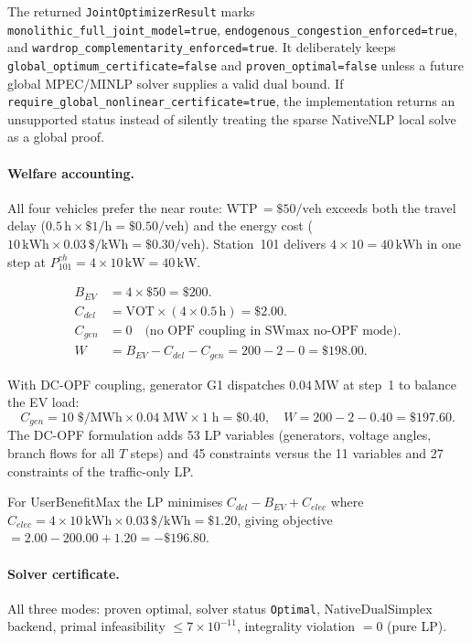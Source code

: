The returned \texttt{JointOptimizerResult} marks
\texttt{monolithic\_full\_joint\_model=true},
\texttt{endogenous\_congestion\_enforced=true}, and
\texttt{wardrop\_complementarity\_enforced=true}.  It deliberately keeps
\texttt{global\_optimum\_certificate=false} and \texttt{proven\_optimal=false}
unless a future global MPEC/MINLP solver supplies a valid dual bound.  If
\texttt{require\_global\_nonlinear\_certificate=true}, the implementation
returns an unsupported status instead of silently treating the sparse NativeNLP
local solve as a global proof.

\paragraph{Welfare accounting.}
All four vehicles prefer the near route: WTP\,$=\$50/\text{veh}$ exceeds
both the travel delay ($0.5\,\text{h} \times \$1/\text{h} = \$0.50/\text{veh}$)
and the energy cost ($10\,\text{kWh} \times 0.03\,\$/\text{kWh} = \$0.30/\text{veh}$).
Station~101 delivers $4 \times 10 = 40\,\text{kWh}$ in one step at
$P^{ch}_{101} = 4 \times 10\,\text{kW} = 40\,\text{kW}$.

\begin{align}
  B_{EV} &= 4 \times \$50 = \$200. \\
  C_{del} &= \text{VOT} \times (4 \times 0.5\,\text{h}) = \$2.00. \\
  C_{gen} &= 0 \quad \text{(no OPF coupling in SWmax no-OPF mode)}. \\
  W &= B_{EV} - C_{del} - C_{gen} = 200 - 2 - 0 = \$198.00.
\end{align}

With DC-OPF coupling, generator G1 dispatches
$0.04\,\text{MW}$ at step~1 to balance the EV load:
\begin{equation}
  C_{gen} = 10\;\$/\text{MWh} \times 0.04\;\text{MW} \times 1\;\text{h} = \$0.40,
  \quad  W = 200 - 2 - 0.40 = \$197.60.
  \label{eq:nr-welfare-opf}
\end{equation}
The DC-OPF formulation adds 53 LP variables (generators, voltage angles,
branch flows for all $T$ steps) and 45 constraints versus the 11 variables
and 27 constraints of the traffic-only LP.

For UserBenefitMax the LP minimises $C_{del} - B_{EV} + C_{elec}$
where $C_{elec} = 4 \times 10\,\text{kWh} \times 0.03\,\$/\text{kWh} = \$1.20$,
giving objective $= 2.00 - 200.00 + 1.20 = -\$196.80$.

\paragraph{Solver certificate.}
All three modes: proven optimal, solver status \texttt{Optimal},
NativeDualSimplex backend, primal infeasibility $\le 7 \times 10^{-11}$,
integrality violation $= 0$ (pure LP).

